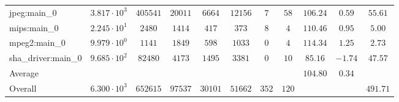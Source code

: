 \begin{tabular}{|l|c|c|c|c|c|c|c|c|c|c|}
jpeg:main\_0            & $ 3.817 \cdot 10^{3}  $ & $ 405541 $ & $ 20011 $ & $ 6664  $ & $ 12156 $ & $ 7   $ & $ 58  $ & $ 106.24      $ & $ 0.59    $ & $ 55.61   $ \\
mips:main\_0            & $ 2.245 \cdot 10^{1}  $ & $ 2480   $ & $ 1414  $ & $ 417   $ & $ 373   $ & $ 8   $ & $ 4   $ & $ 110.46      $ & $ 0.95    $ & $ 5.00    $ \\
mpeg2:main\_0           & $ 9.979 \cdot 10^{0}  $ & $ 1141   $ & $ 1849  $ & $ 598   $ & $ 1033  $ & $ 0   $ & $ 4   $ & $ 114.34      $ & $ 1.25    $ & $ 2.73    $ \\
sha\_driver:main\_0     & $ 9.685 \cdot 10^{2}  $ & $ 82480  $ & $ 4173  $ & $ 1495  $ & $ 3381  $ & $ 0   $ & $ 10  $ & $ 85.16       $ & $ -1.74   $ & $ 47.57   $ \\
\hline
Average                 & $                     $ & $        $ & $       $ & $       $ & $       $ & $     $ & $     $ & $ 104.80      $ & $ 0.34    $ & $         $ \\
\hline
Overall                 & $ 6.300 \cdot 10^{3}  $ & $ 652615 $ & $ 97537 $ & $ 30101 $ & $ 51662 $ & $ 352 $ & $ 120 $ & $             $ & $         $ & $ 491.71  $ \\
\hline
\end{tabular}
